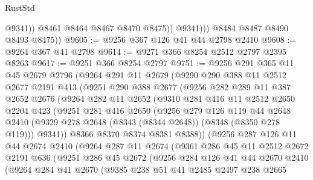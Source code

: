 \begin{lexlean}{RustStd}
\begin{coremodule}
{\begin{coremodule}
{{{{{{{{{{{{{{{{{{{{{{{{{{{{{{{{{{{{{{{{{{{{{{{{{{                      @9341))
                  @8461
                  @8464
                  @8467
                  @8470
                  @8475))
              @9341)))
        @8484
        @8487
        @8490
        @8493
        @8475))
@9605 := @9256 @367 @126 @41 @44 @2798 @2410
@9608 := @9264 @367 @41 @2798
@9614 := @9271 @366 @8254 @2512 @2797 @2395 @8263
@9617 := @9251 @366 @8254 @2797
@9751 := @9256
    @291
    @365
    @11
    @45
    @2679
    @2796
    (@9264
      @291
      @11
      @2679
      (@9290
        @290
        @388
        @11
        @2512
        @2677
        @2191
        @413
        (@9251
          @290
          @388
          @2677
          (@9256
            @282
            @289
            @11
            @387
            @2652
            @2676
            (@9264
              @282
              @11
              @2652
              (@9310
                @281
                @416
                @11
                @2512
                @2650
                @2204
                @423
                (@9251
                  @281
                  @416
                  @2650
                  (@9256
                    @279
                    @126
                    @119
                    @44
                    @2648
                    @2410
                    (@9329 @278 @2648 (@8343 (@8344 @2648)) (@8348 (@8350 @278 @119)))
                    @9341))
                @8366
                @8370
                @8374
                @8381
                @8388))
            (@9256
              @287
              @126
              @11
              @44
              @2674
              @2410
              (@9264
                @287
                @11
                @2674
                (@9361
                  @286
                  @45
                  @11
                  @2512
                  @2672
                  @2191
                  @636
                  (@9251
                    @286
                    @45
                    @2672
                    (@9256
                      @284
                      @126
                      @41
                      @44
                      @2670
                      @2410
                      (@9264
                        @284
                        @41
                        @2670
                        (@9385
                          @238
                          @51
                          @41
                          @2485
                          @2497
                          @238
                          @2665
}}}}}}}}}}}}}}}}}}}}}}}}}}}}}}}}}}}}}}}}}}}}}}}}}}
\end{coremodule}}
\end{coremodule}
\end{lexlean}
